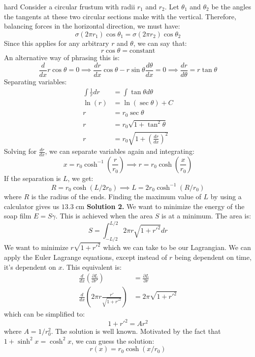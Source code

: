 \begin{solution}{hard}
Consider a circular frustum with radii $r_1$ and $r_2$. Let $\theta_1$ and $\theta_2$ be the angles the tangents at these two circular sections make with the vertical. Therefore, balancing forces in the horizontal direction, we must have:
$$\sigma (2\pi r_1)\cos\theta_1 = \sigma (2\pi r_2)\cos\theta_2$$
Since this applies for any arbitrary $r$ and $\theta$, we can say that:
$$r\cos\theta=\text{constant}$$ 
An alternative way of phrasing this is:
$$\frac{d}{dx} r\cos\theta = 0 \implies \frac{dr}{dx}\cos\theta -r\sin\theta \frac{d\theta}{dx} =0\implies \frac{dr}{d\theta} = r\tan\theta$$
Separating variables:
\begin{align*}
\int \frac{1}{r} dr &= \int \tan\theta d\theta \\
\ln(r) &= \ln(\sec\theta)+C \\
r &= r_0\sec\theta \\
r &= r_0\sqrt{1+\tan^2\theta} \\
r &= r_0\sqrt{1+\left(\frac{dr}{dx}\right)^2}
\end{align*}
Solving for $\frac{dr}{dx}$, we can separate variables again and integrating:
$$x=r_0\cosh^{-1}\left(\frac{r}{r_0}\right) \implies r = r_0\cosh\left(\frac{x}{r_0}\right)$$
If the separation is $L$, we get:
$$R = r_0\cosh(L/2r_0) \implies L = 2r_0\cosh^{-1}\left(R/r_0\right)$$
where $R$ is the radius of the ends. Finding the maximum value of $L$ by using a calculator gives us $13.3\;\mathrm{cm}$
\tcbline
\textbf{Solution 2.} We want to minimize the energy of the soap film $E=S\gamma$. This is achieved when the area $S$ is at a minimum. The area is:
$$S=\int_{-L/2}^{L/2} 2\pi r\sqrt{1+r'^2} dr$$
We want to minimize $r\sqrt{1+r'^2}$ which we can take to be our Lagrangian. We can apply the Euler Lagrange equations, except instead of $r$ being dependent on time, it's dependent on $x$. This equivalent is:
\begin{align*}
\frac{d}{dx}\left(\frac{\partial L}{\partial r'}\right)&=\frac{\partial L}{\partial r} \\
\frac{d}{dx}\left(2\pi r \frac{r'}{\sqrt{1+r'^2}}\right) &= 2\pi\sqrt{1+r'^2}
\end{align*}
which can be simplified to:
$$1+r'^2=Ar^2$$
where $A=1/r_0^2$. The solution is well known. Motivated by the fact that $1+\sinh^2x=\cosh^2x$, we can guess the solution:
$$r(x)=r_0\cosh (x/r_0)$$
\end{solution}